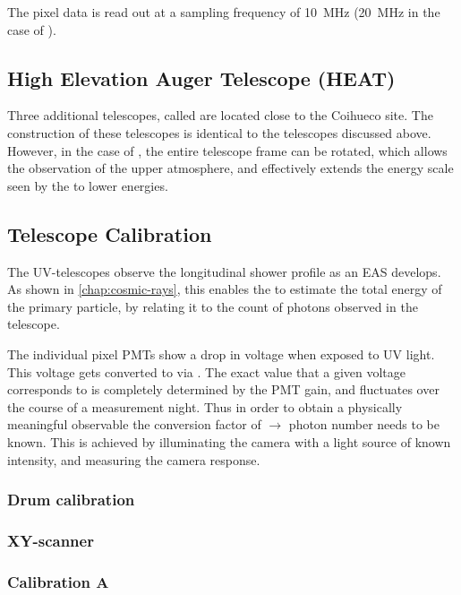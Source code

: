 The pixel data is read out at a sampling frequency of \SI{10}{\mega\hertz} 
(\SI{20}{\mega\hertz} in the case of \HE). 


\subsection{High Elevation Auger Telescope (HEAT)}
\label{ssec:heat}

Three additional telescopes, called \HEs are located close to the Coihueco site.
The construction of these telescopes is identical to the telescopes discussed
above. However, in the case of \HE, the entire telescope frame can be rotated,
which allows the observation of the upper atmosphere, and effectively extends the 
energy scale seen by the \FD to lower energies.


\subsection{Telescope Calibration}
\label{ssec:fd-calibration}

The UV-telescopes observe the longitudinal shower profile as an EAS develops. As 
shown in \autoref{chap:cosmic-rays}, this enables the \FD to estimate the total 
energy of the primary particle, by relating it to the count of photons observed 
in the telescope.

The individual pixel PMTs show a drop  in voltage when exposed to UV light. This
voltage gets converted to \ADC via . The exact \ADC value that a 
given voltage corresponds to is completely determined by the PMT gain, and
fluctuates over the course of a measurement night. Thus in order to obtain a 
physically meaningful observable the conversion factor of \ADC $\rightarrow$ 
photon number needs to be known. This is achieved by illuminating the \FD camera 
with a light source of known intensity, and measuring the camera response. 

\subsubsection{Drum calibration}



\subsubsection{XY-scanner}



\subsubsection{Calibration A}

